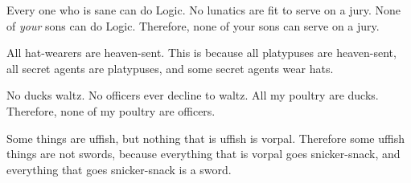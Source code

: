 {\begin{exercises}
\item \label{itm:sons} Every one who is sane can do Logic. No lunatics are fit to serve on a jury. None of \textit{your} sons can do Logic. Therefore, none of your sons can serve on a jury.


\item All hat-wearers are heaven-sent. This is because all platypuses are heaven-sent, all secret agents are platypuses, and some secret agents wear hats. 



\item \label{itm:ducks} No ducks waltz. No officers ever decline to waltz. All my poultry are ducks. Therefore, none of my poultry are officers.




\item Some things are uffish, but nothing that is uffish is vorpal. Therefore some uffish things are not swords, because everything that is vorpal goes snicker-snack, and everything that goes snicker-snack is a sword. 





\end{exercises}}
